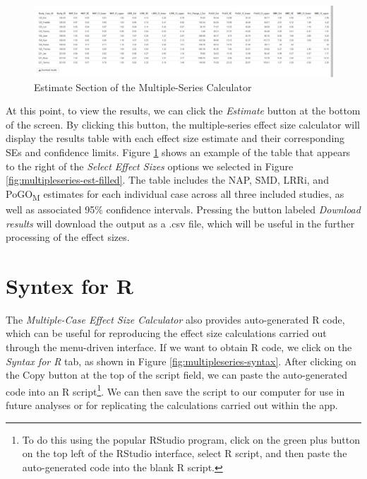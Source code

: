 \documentclass[
]{book}
\begin{document}
\begin{figure}
\includegraphics[width=0.75\linewidth]{images/multiseries_ES.Results} \caption{Estimate Section of the Multiple-Series Calculator}\label{fig:multipleseries-es-res}
\end{figure}

At this point, to view the results, we can click the \emph{Estimate} button at the bottom of the screen. By clicking this button, the multiple-series effect size calculator will display the results table with each effect size estimate and their corresponding SEs and confidence limits. Figure \ref{fig:multipleseries-es-res} shows an example of the table that appears to the right of the \emph{Select Effect Sizes} options we selected in Figure \ref{fig:multipleseries-est-filled}. The table includes the NAP, SMD, LRRi, and PoGO\textsubscript{M} estimates for each individual case across all three included studies, as well as associated 95\(\%\) confidence intervals. Pressing the button labeled \emph{Download results} will download the output as a .csv file, which will be useful in the further processing of the effect sizes.

\hypertarget{syntex-for-r}{%
\section{Syntex for R}\label{syntex-for-r}}

The \emph{Multiple-Case Effect Size Calculator} also provides auto-generated R code, which can be useful for reproducing the effect size calculations carried out through the menu-driven interface. If we want to obtain R code, we click on the \emph{Syntax for R} tab, as shown in Figure \ref{fig:multipleseries-syntax}. After clicking on the Copy button at the top of the script field, we can paste the auto-generated code into an R script\footnote{To do this using the popular RStudio program, click on the green plus button on the top left of the RStudio interface, select R script, and then paste the auto-generated code into the blank R script.}. We can then save the script to our computer for use in future analyses or for replicating the calculations carried out within the app.
\end{document}
